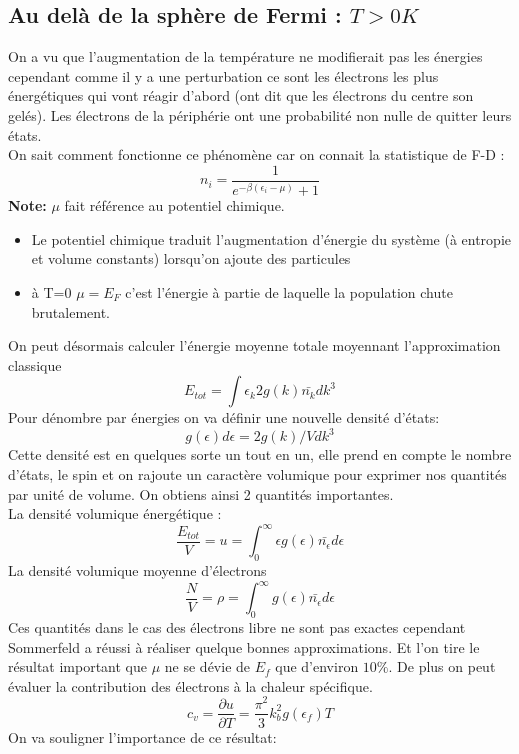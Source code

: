 \subsection{Au delà de la sphère de Fermi : $T>0K$}

On a vu que l'augmentation de la température ne modifierait pas les énergies cependant comme il y a une perturbation ce sont les électrons les plus énergétiques qui vont réagir d'abord (ont dit que les électrons du centre son gelés). Les électrons de la périphérie ont une probabilité non nulle de quitter leurs états.\\
On sait comment fonctionne ce phénomène car on connait la statistique de F-D : 
$$n_i=\frac{1}{e^{-\beta (\epsilon_i-\mu)}+1}$$
\textbf{Note:} $\mu$ fait référence au potentiel chimique.

\begin{itemize}[label=]
\item Le potentiel chimique traduit l'augmentation d'énergie du système (à entropie et volume constants) lorsqu'on ajoute des particules
\item à T=0 $\mu= E_F$ c'est l'énergie à partie de laquelle la population chute brutalement.
\end{itemize}

On peut désormais calculer l'énergie moyenne totale moyennant l'approximation classique 
$$E_{tot}=\int \epsilon_k 2 g(k)\bar{n_k} dk^3$$
Pour dénombre par énergies on va définir une nouvelle densité d'états:
$$g(\epsilon)d\epsilon = 2g(k)/V dk^3$$
Cette densité est en quelques sorte un tout en un, elle prend en compte le nombre d'états, le spin et on rajoute un caractère volumique pour exprimer nos quantités par unité de volume. On obtiens ainsi 2 quantités importantes.\\
La densité volumique énergétique :
$$\frac{E_{tot}}{V}=u= \int_0^\infty \epsilon g(\epsilon) \bar{n_\epsilon}d\epsilon$$
La densité volumique moyenne d'électrons
$$\frac{N}{V}=\rho = \int_0^\infty  g(\epsilon) \bar{n_\epsilon}d\epsilon$$
Ces quantités dans le cas des électrons libre ne sont pas exactes cependant Sommerfeld a réussi à réaliser quelque bonnes approximations. Et l'on tire le résultat important que $\mu$ ne se dévie de $E_f$ que d'environ $10\%$. De plus on peut évaluer la contribution des électrons à la chaleur spécifique.
$$c_v = \frac{\partial u}{\partial T}= \frac{\pi^2}{3}k_b^2 g(\epsilon_f)T$$
On va souligner l'importance de ce résultat:

